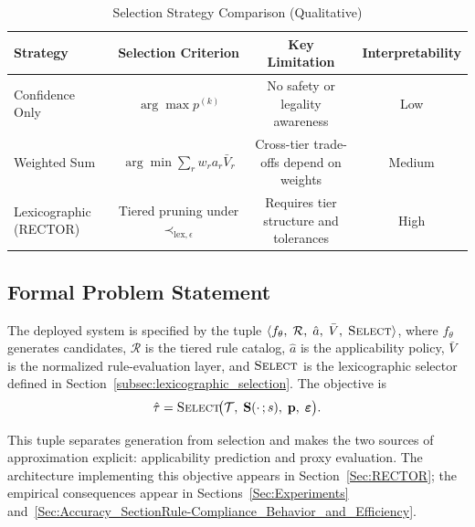 \begin{table}
\centering
\caption{Selection Strategy Comparison (Qualitative)}
\label{tab:selection_strategy_qualitative}
\begin{tabular}{lccc}
\toprule
\textbf{Strategy} & \textbf{Selection Criterion} & \textbf{Key Limitation} & \textbf{Interpretability} \\
\midrule
Confidence Only & $\arg\max p^{(k)}$ & No safety or legality awareness & Low \\
Weighted Sum & $\arg\min \sum_r w_r a_r \bar{V}_r$ & Cross-tier trade-offs depend on weights & Medium \\
Lexicographic (RECTOR) & Tiered pruning under $\prec_{\text{lex},\epsilon}$ & Requires tier structure and tolerances & High \\
\bottomrule
\end{tabular}
\end{table}

\subsection{Formal Problem Statement}
\label{subsec:problem_statement}

\begin{problem}
\label{prob:selection}
The deployed system is specified by the tuple
$\langle f_\theta,\; \mathcal{R},\; \hat{a},\; \bar{V},\; \textsc{Select}\rangle$,
where $f_\theta$ generates candidates, $\mathcal{R}$ is the tiered rule catalog, $\hat{a}$ is the applicability policy, $\bar{V}$ is the normalized rule-evaluation layer, and $\textsc{Select}$ is the lexicographic selector defined in Section~\ref{subsec:lexicographic_selection}. The objective is
\begin{equation}
\hat{\tau}=\textsc{Select}\!\big(\mathcal{T},\;\mathbf{S}(\cdot\,;s),\;\mathbf{p},\;\boldsymbol{\varepsilon}\big).
\end{equation}
\end{problem}

This tuple separates generation from selection and makes the two sources of approximation explicit: applicability prediction and proxy evaluation. The architecture implementing this objective appears in Section~\ref{Sec:RECTOR}; the empirical consequences appear in Sections~\ref{Sec:Experiments} and~\ref{Sec:Accuracy_SectionRule-Compliance_Behavior_and_Efficiency}.
